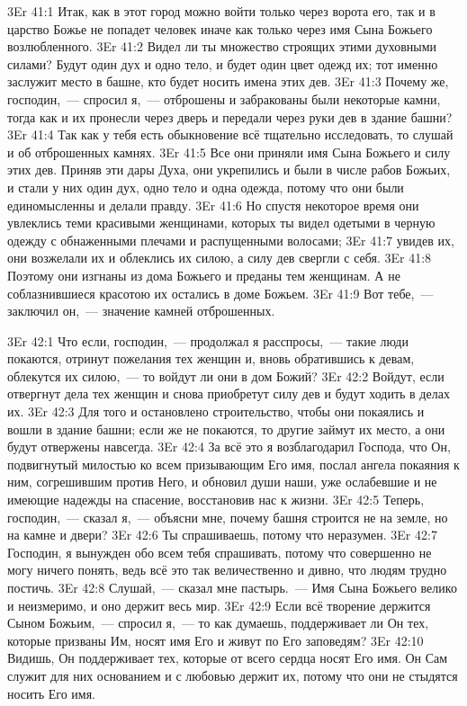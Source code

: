 \vs 3Er 41:1
Итак, как в этот город
можно войти только через ворота его, так и в царство Божье не попадет человек
иначе как только через имя Сына Божьего возлюбленного.
\vs 3Er 41:2
Видел ли ты множество
строящих этими духовными силами? Будут один дух и одно тело, и будет один цвет
одежд их; тот именно заслужит место в башне, кто будет носить имена этих дев.
\vs 3Er 41:3
Почему же, господин,~--- спросил я,~--- отброшены и забракованы были некоторые камни, тогда как и их
пронесли через дверь и передали через руки дев в здание башни?
\vs 3Er 41:4
Так как у тебя есть
обыкновение всё тщательно исследовать, то слушай и об отброшенных камнях.
\vs 3Er 41:5
Все они приняли имя Сына
Божьего и силу этих дев. Приняв эти дары Духа, они укрепились и были в числе
рабов Божьих, и стали у них один дух, одно тело и одна одежда, потому что они
были единомысленны и делали правду.
\vs 3Er 41:6
Но спустя некоторое время
они увлеклись теми красивыми женщинами, которых ты видел одетыми в черную
одежду с обнаженными плечами и распущенными волосами;
\vs 3Er 41:7
увидев их, они возжелали
их и облеклись их силою, а силу дев свергли с себя.
\vs 3Er 41:8
Поэтому они изгнаны из
дома Божьего и преданы тем женщинам. А не соблазнившиеся красотою их остались
в доме Божьем.
\vs 3Er 41:9
Вот тебе,~--- заключил он,~--- значение камней отброшенных.

\vs 3Er 42:1
Что если, господин,~--- продолжал я расспросы,~--- такие люди покаются, отринут пожелания тех женщин и,
вновь обратившись к девам, облекутся их силою,~--- то войдут ли они в дом Божий?
\vs 3Er 42:2
Войдут, если отвергнут
дела тех женщин и снова приобретут силу дев и будут ходить в делах их.
\vs 3Er 42:3
Для того и остановлено
строительство, чтобы они покаялись и вошли в здание башни; если же не
покаются, то другие займут их место, а они будут отвержены навсегда.
\vs 3Er 42:4
За всё это я возблагодарил
Господа, что Он, подвигнутый милостью ко всем призывающим Его имя, послал
ангела покаяния к ним, согрешившим против Него, и обновил души наши, уже
ослабевшие и не имеющие надежды на спасение, восстановив нас к жизни.
\vs 3Er 42:5
Теперь, господин,~--- сказал
я,~--- объясни мне, почему башня строится не на земле, но на камне и двери?
\vs 3Er 42:6
Ты спрашиваешь, потому что
неразумен.
\vs 3Er 42:7
Господин, я вынужден обо
всем тебя спрашивать, потому что совершенно не могу ничего понять, ведь всё
это так величественно и дивно, что людям трудно постичь.
\vs 3Er 42:8
Слушай,~--- сказал мне
пастырь.~--- Имя Сына Божьего велико и неизмеримо, и оно держит весь мир.
\vs 3Er 42:9
Если всё творение держится
Сыном Божьим,~--- спросил я,~--- то как думаешь, поддерживает ли Он тех, которые
призваны Им, носят имя Его и живут по Его заповедям?
\vs 3Er 42:10
Видишь, Он поддерживает
тех, которые от всего сердца носят Его имя. Он Сам служит для них основанием и
с любовью держит их, потому что они не стыдятся носить Его имя.

